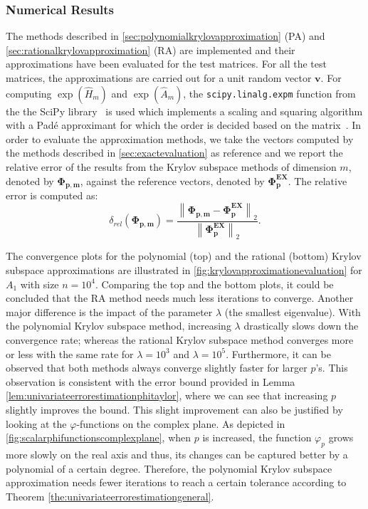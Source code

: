 \FloatBarrier

\subsubsection*{Numerical Results}
The methods described in \autoref{sec:polynomialkrylovapproximation} (PA)
and \autoref{sec:rationalkrylovapproximation} (RA)
are implemented and their approximations have been evaluated for the test matrices.
For all the test matrices, the approximations are carried out for a unit
random vector $\mathbf{v}$.
For computing $\exp(\hat{H}_m)$ and $\exp(\hat{A}_m)$, the \texttt{scipy.linalg.expm}
function from the the SciPy library~\cite{SciPy2020} is used which implements a
scaling and squaring algorithm with a Padé approximant for which the order is decided
based on the matrix~\cite{almohy2010scaling}.
In order to evaluate the approximation methods, we take the vectors computed by the methods
described in \autoref{sec:exactevaluation} as reference and we report the relative
error of the results from the Krylov subspace methods of dimension $m$, denoted by
$\mathbf{\Phi_{p, m}}$, against the reference vectors, denoted by $\mathbf{\Phi_p^{EX}}$.
The relative error is computed as:
\begin{equation*}
    \delta_{rel}(\mathbf{\Phi_{p, m}}) =
    \frac{\left\| \mathbf{\Phi_{p, m}} - \mathbf{\Phi_p^{EX}} \right\|_2}
    {\left\| \mathbf{\Phi_p^{EX}} \right\|_2}.
\end{equation*}

The convergence plots for the polynomial (top) and the rational (bottom) Krylov subspace approximations are
illustrated in \autoref{fig:krylovapproximationevaluation} for $A_1$ with size $n=10^{4}$.
Comparing the top and the bottom plots, it could be concluded that the RA method needs
much less iterations to converge.
Another major difference is the impact of the parameter $\lambda$ (the smallest eigenvalue).
With the polynomial Krylov subspace method, increasing $\lambda$ drastically slows down the convergence rate;
whereas the rational Krylov subspace method converges more or less with the same rate for
$\lambda=10^{3}$ and $\lambda=10^{5}$.
Furthermore, it can be observed that both methods always converge slightly faster for
larger $p$'s. This observation is consistent with the error bound provided in Lemma
\ref{lem:univariateerrorestimationphitaylor}, where we can see that increasing $p$ slightly
improves the bound. This slight improvement can also be justified by looking at the
$\varphi$-functions on the complex plane. As depicted in
\autoref{fig:scalarphifunctionscomplexplane}, when $p$ is increased, the
function $\varphi_p$ grows more slowly on the real axis and thus, its changes can be
captured better by a polynomial of a certain degree.
Therefore, the polynomial Krylov subspace approximation needs fewer iterations to reach a certain
tolerance according to Theorem \ref{the:univariateerrorestimationgeneral}.

